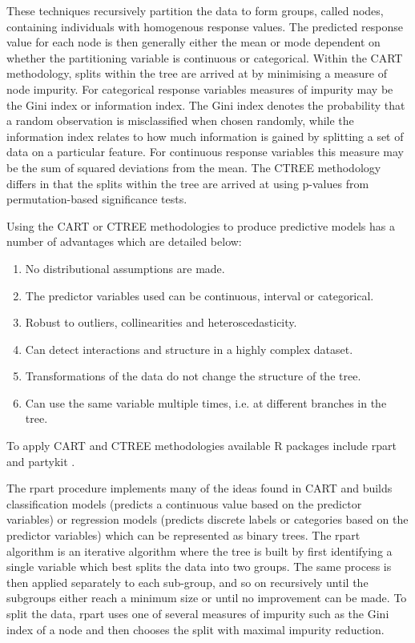 These techniques recursively partition the data to form groups, called nodes, containing individuals with homogenous response values. The predicted response value for each node is then generally either the mean or mode dependent on whether the partitioning variable is continuous or categorical. Within the CART methodology, splits within the tree are arrived at by minimising a measure of node impurity. For categorical response variables measures of impurity may be the Gini index or information index. The Gini index denotes the probability that a random observation is misclassified when chosen randomly, while the information index relates to how much information is gained by splitting a set of data on a particular feature. For continuous response variables this measure may be the sum of squared deviations from the mean. The CTREE methodology differs in that the splits within the tree are arrived at using p-values from permutation-based significance tests.  

Using the CART or CTREE methodologies to produce predictive models has a number of advantages which are detailed below: 

\begin{enumerate}
\item No distributional assumptions are made. 
\item The predictor variables used can be continuous, interval or categorical. 
\item Robust to outliers, collinearities and heteroscedasticity. 
\item Can detect interactions and structure in a highly complex dataset. 
\item Transformations of the data do not change the structure of the tree. 
\item Can use the same variable multiple times, i.e. at different branches in the tree.
\end{enumerate}

To apply CART and CTREE methodologies available R packages include rpart \citep{therneau1997introduction} and partykit \citep{hothorn_hornik_zeileis_2006, ctree1}. 

The rpart procedure \citep{therneau1997introduction} implements many of the ideas found in CART and builds classification models (predicts a continuous value based on the predictor variables) or regression models (predicts discrete labels or categories based on the predictor variables) which can be represented as binary trees. The rpart algorithm is an iterative algorithm where the tree is built by first identifying a single variable which best splits the data into two groups. The same process is then applied separately to each sub-group, and so on recursively until the subgroups either reach a minimum size or until no improvement can be made. To split the data, rpart uses one of several measures of impurity such as the Gini index of a node and then chooses the split with maximal impurity reduction.

